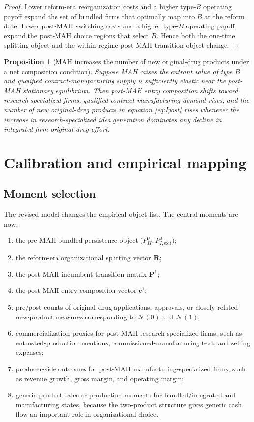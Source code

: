 \documentclass[12pt]{article}
\newtheorem{proposition}{Proposition}
\newcommand{\1}{\mathbf{1}}
\newcommand{\Inew}{\mathcal{N}}
\begin{document}
\begin{proof}
Lower reform-era reorganization costs and a higher type-$B$ operating payoff expand the set of bundled firms that optimally map into $B$ at the reform date. Lower post-MAH switching costs and a higher type-$B$ operating payoff expand the post-MAH choice regions that select $B$. Hence both the one-time splitting object and the within-regime post-MAH transition object change.
\end{proof}

\begin{proposition}[MAH increases the number of new original-drug products under a net composition condition]
Suppose MAH raises the entrant value of type $B$ and qualified contract-manufacturing supply is sufficiently elastic near the post-MAH stationary equilibrium. Then post-MAH entry composition shifts toward research-specialized firms, qualified contract-manufacturing demand rises, and the number of new original-drug products in equation \eqref{eq:Ipost} rises whenever the increase in research-specialized idea generation dominates any decline in integrated-firm original-drug effort.
\end{proposition}

\section{Calibration and empirical mapping}

\subsection{Moment selection}

The revised model changes the empirical object list. The central moments are now:
\begin{enumerate}[leftmargin=2em]
    \item the pre-MAH bundled persistence object $\bigl(P_{II}^0,P_{I,\mathrm{exit}}^0\bigr)$;
    \item the reform-era organizational splitting vector $\mathbf R$;
    \item the post-MAH incumbent transition matrix $\mathbf P^1$;
    \item the post-MAH entry-composition vector $\mathbf e^1$;
    \item pre/post counts of original-drug applications, approvals, or closely related new-product measures corresponding to $\Inew(0)$ and $\Inew(1)$;
    \item commercialization proxies for post-MAH research-specialized firms, such as entrusted-production mentions, commissioned-manufacturing text, and selling expenses;
    \item producer-side outcomes for post-MAH manufacturing-specialized firms, such as revenue growth, gross margin, and operating margin;
    \item generic-product sales or production moments for bundled/integrated and manufacturing states, because the two-product structure gives generic cash flow an important role in organizational choice.
\end{enumerate}
\end{document}
